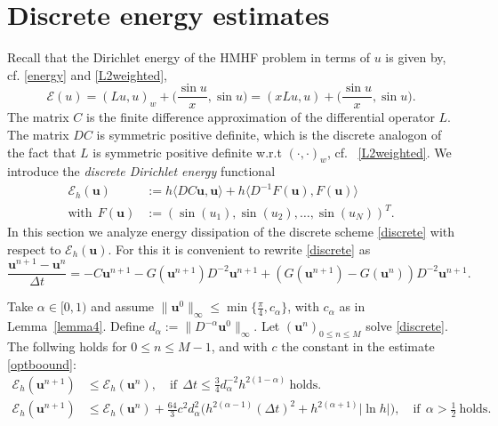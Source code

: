 \documentclass{siamltex}
\newcommand{\bu}{\mathbf u}
\newcommand{\cE}{\mathcal E}
\begin{document}
{\section{Discrete energy estimates} \label{sec:Energy}
Recall that the Dirichlet energy of the HMHF problem in terms of $u$ is given by, cf. \eqref{energy} and \eqref{L2weighted},
\[
  \cE(u)=(Lu,u)_w+\big(\frac{\sin u}{x}, \sin u\big) = (xLu,u)+\big(\frac{\sin u}{x}, \sin u\big). 
\]
The matrix $C$ is the finite difference approximation of the differential operator $L$. The matrix $DC$ is symmetric positive definite, which is the discrete analogon of the fact that $L$ is symmetric positive definite w.r.t $(\cdot, \cdot)_w$, cf.~ \eqref{L2weighted}. We introduce the \emph{discrete Dirichlet energy} functional
\begin{equation}
	\label{discrete_energy}
	\begin{split} \cE_h(\bu) & := h \langle DC \bu,\bu \rangle + h \langle D^{-1} F(\bu),F(\bu) \rangle   
	 \\
\text{with}~~
	F(\bu) & :=  \left( \sin (u_1), \sin(u_2),\hdots,\sin(u_N) \right)^T. \end{split}
\end{equation}
In this section we analyze energy dissipation of the discrete scheme \eqref{discrete} with respect to $\cE_h(\bu)$. 
For this it is convenient to  rewrite \eqref{discrete} as
\begin{equation}
	\label{discrete_v2}
	\frac{\bu^{n+1}-\bu^n}{\Delta t}= - C \bu^{n+1}-G(\bu^{n+1})D^{-2}\bu^{n+1}+\left( G(\bu^{n+1})-G(\bu^{n})\right) D^{-2}\bu^{n+1}.
\end{equation}
%
\begin{lemma}
	\label{energy_lemma} Take $\alpha  \in [0, 1)$ and assume $\|\bu^0\|_\infty \leq \min\{ 
	\frac{\pi}{4},c_\alpha\}$, with $c_\alpha$ as in Lemma~\ref{lemma4}.
Define $d_\alpha:=\|D^{-\alpha}\bu^0\|_\infty$. 
	 Let $(\bu^{n})_{0 \leq n \leq M}$ solve \eqref{discrete}. The follwing holds for $0 \leq n \leq M-1$, and with $c$ the constant in the estimate \eqref{optboound}:
	\begin{align}   
		\cE_h(\bu^{n+1}) & \leq \cE_h(\bu^{n}), \quad \text{if}~~\Delta t \leq \tfrac34 d_\alpha^{-2} h^{2(1-\alpha)}~\text{holds.} \label{diss2} \\
		\cE_h(\bu^{n+1}) & \leq \cE_h(\bu^{n}) + \tfrac{64}{3} c^2 d_\alpha^2 \big(h^{2(\alpha-1)}(\Delta t)^2 +h^{2(\alpha +1)}|\ln h|\big), \quad \text{if}~~\alpha > \tfrac12~\text{holds.}  \label{diss1}
	\end{align}

\end{lemma}}
\end{document}
